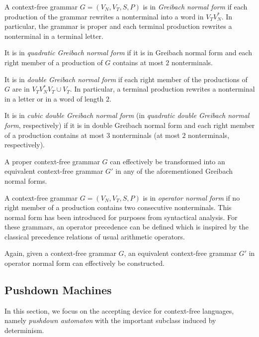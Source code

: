 A context-free grammar $G = (V_N, V_T, S, P)$ is in \emph{Greibach normal form} if each production of the grammar rewrites a nonterminal into a word in $V_T V_N^*$. In particular, the grammar is proper and each terminal production rewrites a nonterminal in a terminal letter.

It is in \emph{quadratic Greibach normal form} if it is in Greibach normal form and each right member of a production of $G$ contains at most $2$ nonterminals.

It is in \emph{double Greibach normal form} if each right member of the productions  of $G$ are in $V_T V_N^* V_T \cup V_T$. In particular, a terminal production  rewrites a nonterminal in a letter or in a word of length $2$.

It is in \emph{cubic double Greibach normal form} (in \emph{quadratic double Greibach normal form}, respectively) if it is in double Greibach normal form and each right member of a production contains at most $3$ nonterminals (at most $2$ nonterminals, respectively).

A proper context-free grammar $G$ can effectively be transformed into an equivalent context-free grammar $G'$ in any of the aforementioned Greibach normal forms.

A context-free grammar $G = (V_N, V_T, S, P)$ is in \emph{operator normal form} if no right member of a production contains two consecutive nonterminals. This normal form has been introduced for purposes from syntactical analysis. For these grammars, an operator precedence can be defined which is inspired by the classical precedence relations of usual arithmetic operators.

Again, given a context-free grammar $G$, an equivalent context-free grammar $G'$ in operator normal form can effectively be constructed.

\subsection{Pushdown Machines}
\label{subsection:pushdown-machines}

In this section, we focus on the accepting device for context-free languages, namely \emph{pushdown automaton} with the important subclass induced by determinism.

